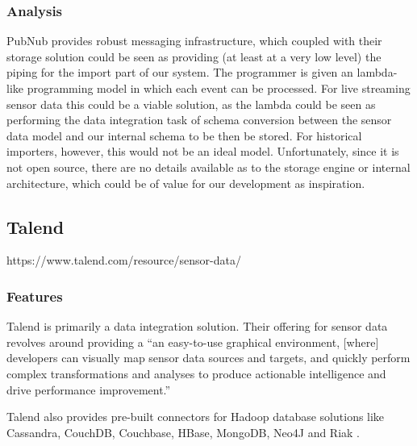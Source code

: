 

\subsubsection{Analysis}\label{analysis-1}

PubNub provides robust messaging infrastructure, which coupled with their storage
solution could be seen as providing (at least at a very low level) the piping
for the import part of our system. The programmer is given an lambda-like
programming model in which each event can be processed. For live streaming
sensor data this could be a viable solution, as the lambda could be seen as
performing the data integration task of schema conversion between the sensor
data model and our internal schema to be then be stored. For historical
importers, however, this would not be an ideal model. Unfortunately, since
it is not open source, there are no details available as to the storage engine
or internal architecture, which could be of value for our development as inspiration.

\subsection{Talend}\label{talend}

https://www.talend.com/resource/sensor-data/

\subsubsection{Features}\label{features-2}

Talend is primarily a data integration solution. Their offering for sensor data
revolves around providing a ``an easy-to-use graphical environment, [where] developers
can visually map sensor data sources and targets, and quickly perform complex
transformations and analyses to produce actionable intelligence and drive
performance improvement.''

Talend also provides pre-built connectors for Hadoop database solutions like
Cassandra, CouchDB, Couchbase, HBase, MongoDB, Neo4J and Riak .

